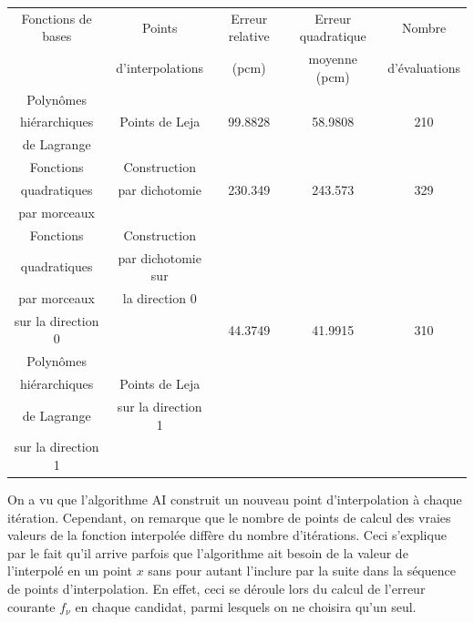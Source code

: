 \begin{center}
\begin{table}[!h]
\begin{tabular}{|*{5}{c|}}
	\hline
	Fonctions de bases 		& Points 			 									& Erreur relative	& Erreur quadratique 	& Nombre 		\\
												&	d'interpolations							&	 (pcm)					& moyenne (pcm)			 	& d'évaluations			\\
	\hline
	Polynômes  						&&&&\\
	hiérarchiques					& Points de Leja 		 						& 99.8828					& 58.9808 						& 210									\\
	de Lagrange						&&&&\\
	\hline
	Fonctions 						&	Construction			 						&&&\\
	quadratiques 					&	par dichotomie								&	230.349 				& 243.573							& 329 								\\
	par morceaux  				&   					   								&&&\\
	\hline
	Fonctions     				& Construction									&&&\\
	quadratiques					& par dichotomie sur 						&&&\\
	par morceaux					& la direction 0								&&&\\
	sur la direction 0		&																&	44.3749 				& 41.9915							& 310 								\\
	Polynômes     				&  															&&&\\
	hiérarchiques					& Points de Leja								&&&\\
	de Lagrange						& sur la direction 1						&&&\\
	sur la direction 1		&																&&&\\
	\hline
\end{tabular}
\label{table:analytics}
\end{table}
\end{center}
\hspace{0.5cm}
On a vu que l'algorithme AI construit un nouveau point d'interpolation à chaque itération. Cependant, on remarque que le nombre de points de calcul des vraies valeurs de la fonction interpolée diffère du nombre d'itérations. Ceci s'explique par le fait qu'il arrive parfois que l'algorithme ait besoin de la valeur de l'interpolé en un point $x$ sans pour autant l'inclure par la suite dans la séquence de points d'interpolation. En effet, ceci se déroule lors du calcul de l'erreur courante $f_{\nu}$ en chaque candidat, parmi lesquels on ne choisira qu'un seul. \\
